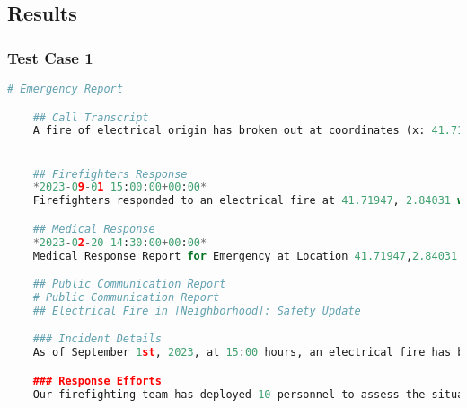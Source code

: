 \subsection{Results}\label{subsec:results}

\subsubsection{Test Case 1}
\begin{lstlisting}[language=Python]
    # Emergency Report

    ## Call Transcript
    A fire of electrical origin has broken out at coordinates (x: 41.71947, y: 2.84031). The fire is classified as high severity, posing significant danger to the area. Hazards present include gas cylinders and flammable chemicals, further escalating the risk. The fire is indoors, and there are 5 people currently trapped. Additionally, there are 2 injured individuals with minor and severe injuries respectively requiring immediate attention.


    ## Firefighters Response
    *2023-09-01 15:00:00+00:00*
    Firefighters responded to an electrical fire at 41.71947, 2.84031 with high severity. 10 firefighters were deployed and completed activities such as assessing the fire spread, deploying ladder engines, extinguishing the fire, and investigating potential hazards. The trapped people have been identified as 5 individuals.

    ## Medical Response
    *2023-02-20 14:30:00+00:00*
    Medical Response Report for Emergency at Location 41.71947,2.84031. Total Paramedics Deployed: 5, Total Ambulances Dispatched: 1. Estimated Arrival Time: 2023-02-20T15:00:00Z. Equipment Provided: Oxygen Mask for minor injury, Stretcher for severe injury.

    ## Public Communication Report
    # Public Communication Report
    ## Electrical Fire in [Neighborhood]: Safety Update

    ### Incident Details
    As of September 1st, 2023, at 15:00 hours, an electrical fire has been reported at location [41.71947, 2.84031]. The fire's severity is classified as high, with hazardous materials present, including gas cylinders and flammable chemicals.

    ### Response Efforts
    Our firefighting team has deployed 10 personnel to assess the situation, deploy ladder engines, extinguish the fire, and investigate potential hazards. Medical responders have been dispatched with a total of 5 paramedics and 1 ambulance. We urge the public to exercise caution in the surrounding area.


\end{lstlisting}
